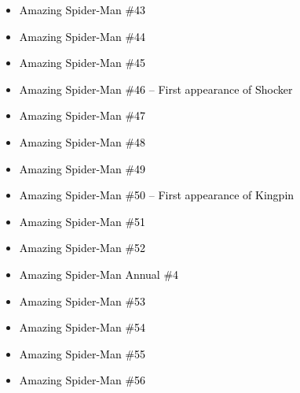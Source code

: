 \documentclass[12pt]{article}
\newcommand{\checkbox}{\raisebox{0.0ex}{\fbox{\rule{0ex}{1.5ex} \rule{1.5ex}{0ex}}}}
\begin{document}
\begin{center}
\begin{tcolorbox}[colback=white!95!gray, colframe=black, width=0.9\textwidth, arc=4mm, auto outer arc, boxrule=0.8pt]
\begin{itemize}[left=0pt,label={\checkbox}]
    \item \textcolor{black}{Amazing Spider-Man \#43}
    \item \textcolor{black}{Amazing Spider-Man \#44}
    \item \textcolor{black}{Amazing Spider-Man \#45}
    \item \textcolor{black}{Amazing Spider-Man \#46 – First appearance of Shocker}
    \item \textcolor{black}{Amazing Spider-Man \#47}
    \item \textcolor{black}{Amazing Spider-Man \#48}
    \item \textcolor{black}{Amazing Spider-Man \#49}
    \item \textcolor{black}{Amazing Spider-Man \#50 – First appearance of Kingpin}
    \item \textcolor{black}{Amazing Spider-Man \#51}
    \item \textcolor{black}{Amazing Spider-Man \#52}
    \item \textcolor{black}{Amazing Spider-Man Annual \#4}
    \item \textcolor{black}{Amazing Spider-Man \#53}
    \item \textcolor{black}{Amazing Spider-Man \#54}
    \item \textcolor{black}{Amazing Spider-Man \#55}
    \item \textcolor{black}{Amazing Spider-Man \#56}
\end{itemize}
\end{tcolorbox}
\end{center}
\end{document}
